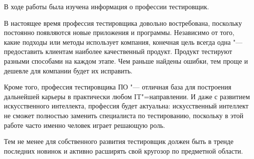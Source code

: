 В ходе работы была изучена информация о профессии тестировщик.

В настоящее время профессия тестировщика довольно востребована, поскольку 
постоянно появляются новые приложения и программы. Независимо от того, какие 
подходы или методы использует компания, конечная цель всегда одна "--- 
предоставить клиентам наиболее качественный продукт. Продукт тестируют разными 
способами на каждом этапе. Чем раньше найдены ошибки, тем проще и дешевле для 
компании будет их исправить.

Кроме того, профессия тестировщика ПО "--- отличная база для построения 
дальнейшей карьеры в практически любом IT"=направлении. И даже с развитием 
искусственного интеллекта, профессия будет актуальна: искусственный интеллект не 
сможет полностью заменить специалиста по тестированию, поскольку в этой работе 
часто именно человек играет решающую роль.

Тем не менее для собственного развития тестировщик должен быть в тренде 
последних новинок и активно расширять свой кругозор по предметной области.
